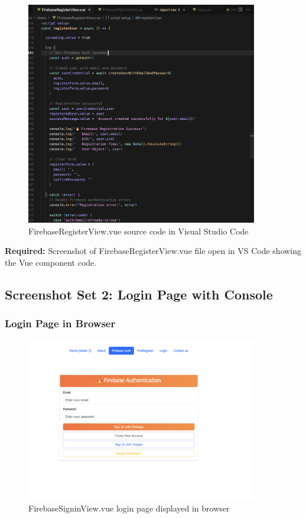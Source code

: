 \documentclass[11pt,a4paper]{article}
\begin{document}
 \begin{figure}[H]
     \centering
     \includegraphics[width=0.9\textwidth]{registration_vscode.png}
     \caption{FirebaseRegisterView.vue source code in Visual Studio Code}
     \label{fig:reg_vscode}
 \end{figure}

\textbf{Required:} Screenshot of FirebaseRegisterView.vue file open in VS Code showing the Vue component code.

\subsection{Screenshot Set 2: Login Page with Console}

\subsubsection{Login Page in Browser}

\begin{figure}[H]
    \centering
    \includegraphics[width=0.9\textwidth]{login_browser.png}
    \caption{FirebaseSigninView.vue login page displayed in browser}
    \label{fig:login_browser}
\end{figure}
\end{document}

